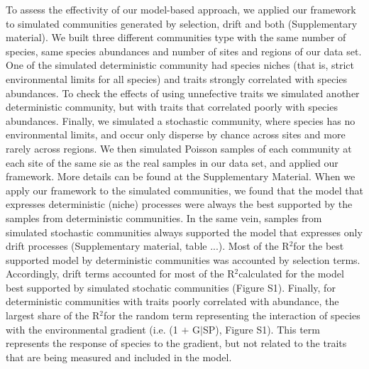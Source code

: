 \documentclass[12pt]{article}
\renewcommand{\Rsquared}{R{$^2$}}
\begin{document}
To assess the effectivity of our model-based approach, we applied our framework to simulated communities generated by selection, drift and both (Supplementary material). We built three different communities type with the same number of species, same species abundances and number of sites and regions of our data set. One of the simulated deterministic community had species niches (that is, strict environmental limits for all species) and traits strongly correlated with species abundances. To check the effects of using unnefective traits we simulated another deterministic community, but with traits that correlated poorly with species abundances. Finally, we simulated a stochastic community, where species has no environmental limits, and occur only disperse by chance across sites and more rarely across regions.
We then simulated Poisson samples of each community at each site of the same sie as the real samples in our data set, and applied our framework. More details can be found at the Supplementary Material.
When we apply our framework to the simulated communities, we found that the model that expresses deterministic (niche) processes were always the best supported by the samples from deterministic communities. In the same vein, samples from simulated stochastic communities always supported the model that expresses only drift processes (Supplementary material, table ...). Most of the  \Rsquared  for the best supported model by deterministic communities was accounted by selection terms. Accordingly, drift terms accounted for most of the \Rsquared calculated for the model best supported by simulated stochatic communities (Figure S1). Finally, for deterministic communities with traits poorly correlated with abundance, the largest share of the \Rsquared for the random term representing the interaction of species with the environmental gradient (i.e. (1 $+$ G$|$SP), Figure S1). This term represents the response of species to the gradient, but not related to the traits that are being measured and included in the model.   
\end{document}
